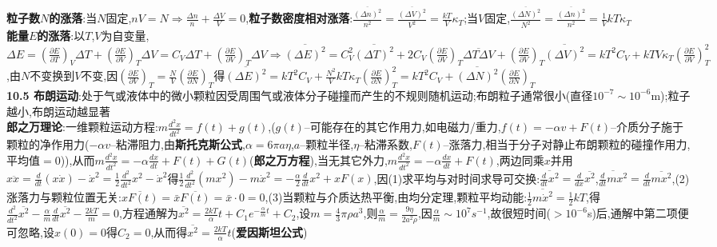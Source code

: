 \documentclass[10pt,a4paper]{article}
\begin{document}
\begin{multicols}{2}
\textbf{粒子数$N$的涨落}:当$N$固定,$nV=N\Rightarrow\frac{\Delta n}{n}+\frac{\Delta V}{V}=0$,\textbf{粒子数密度相对涨落}:$\frac{\overline{(\Delta n)^2}}{n^2}=\frac{\overline{(\Delta V)^2}}{V^2}=\frac{kT}{V}\kappa_T$;当$V$固定,$\frac{\overline{(\Delta N)^2}}{N^2}=\frac{\overline{(\Delta n)^2}}{n^2}=\frac{1}{V}kT\kappa_T$\\
\textbf{能量$E$的涨落}:以$T$,$V$为自变量,$\Delta E=\left(\frac{\partial E}{\partial T}\right)_V\Delta T+\left(\frac{\partial E}{\partial V}\right)_T\Delta V=C_V\Delta T+\left(\frac{\partial E}{\partial V}\right)_T\Delta V\Rightarrow\overline{(\Delta E)^2}=C_V^2\overline{(\Delta T)^2}+2C_V\left(\frac{\partial E}{\partial V}\right)_T\overline{\Delta T\Delta V}+\left(\frac{\partial E}{\partial V}\right)_T\overline{(\Delta V)^2}=kT^2C_V+kTV\kappa_T\left(\frac{\partial E}{\partial V}\right)_T^2$,由$N$不变换到$V$不变,因$\left(\frac{\partial E}{\partial V}\right)_T=\frac{N}{V}\left(\frac{\partial E}{\partial N}\right)_T$得$\overline{(\Delta E)^2}=kT^2C_V+\frac{N^2}{V}kT\kappa_T\left(\frac{\partial E}{\partial N}\right)_T^2=kT^2C_V+\overline{(\Delta N)^2}\left(\frac{\partial E}{\partial N}\right)_T$\\
\textbf{10.5 布朗运动}:处于气或液体中的微小颗粒因受周围气或液体分子碰撞而产生的不规则随机运动;布朗粒子通常很小(直径$10^{-7}\sim10^{-6}$m);粒子越小,布朗运动越显著\\
\textbf{郎之万理论}:一维颗粒运动方程:$m\frac{d^2x}{dt^2}=f(t)+g(t)$,($g(t)$--可能存在的其它作用力,如电磁力/重力,$f(t)=-\alpha v+F(t)$--介质分子施于颗粒的净作用力($-\alpha v$--粘滞阻力,由\textbf{斯托克斯公式},$\alpha=6\pi a\eta$,$a$--颗粒半径,$\eta$--粘滞系数,$F(t)$--涨落力,相当于分子对静止布朗颗粒的碰撞作用力,平均值$=0$)),从而$m\frac{d^2x}{dt^2}=-\alpha\frac{dx}{dt}+F(t)+G(t)$(\textbf{郎之万方程}),当无其它外力,$m\frac{d^2x}{dt^2}=-\alpha\frac{dx}{dt}+F(t)$,两边同乘$x$并用$x\ddot{x}=\frac{d}{dt}(x\dot{x})-\dot{x}^2=\frac{1}{2}\frac{d^2}{dt^2}x^2-\dot{x}^2$得$\frac{1}{2}\frac{d^2}{dt^2}(mx^2)-m\dot{x}^2=-\frac{\alpha}{2}\frac{d}{dt}x^2+xF(x)$,因(1)求平均与对时间求导可交换:$\overline{\frac{d}{dt}x^2}=\frac{d}{dx}\overline{x^2}$,$\overline{\frac{d}{dt}mx^2}=\frac{d}{dt}\overline{mx^2}$,(2)涨落力与颗粒位置无关:$\overline{xF(t)}=\bar{x}\overline{F(t)}=\bar{x}\cdot0=0$,(3)当颗粒与介质达热平衡,由均分定理,颗粒平均动能:$\frac{1}{2}\overline{m\dot{x}^2}=\frac{1}{2}kT$,得$\frac{d^2}{dt^2}\overline{x^2}-\frac{\alpha}{m}\frac{d}{dt}\overline{x^2}-\frac{2kT}{m}=0$,方程通解为$\overline{x^2}=\frac{2kT}{\alpha}t+C_1e^{-\frac{\alpha}{m}t}+C_2$,设$m=\frac{4}{3}\pi\rho a^3$,则$\frac{\alpha}{m}=\frac{9\eta}{2a^2\rho}$,因$\frac{\alpha}{m}\sim10^7s^{-1}$,故很短时间($>10^{-6}$s)后,通解中第二项便可忽略,设$x(0)=0$得$C_2=0$,从而得$\overline{x^2}=\frac{2kT}{\alpha}t$(\textbf{爱因斯坦公式})\\

\end{multicols}
\end{document}
